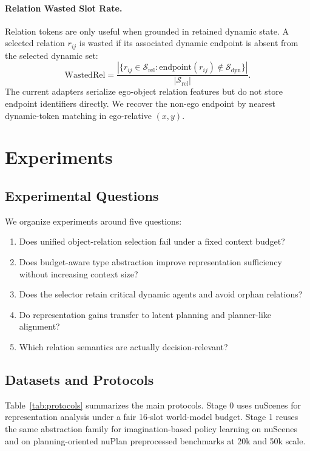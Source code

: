 \documentclass[10pt]{article}
\newcommand{\sdyn}{\mathcal{S}_{\mathrm{dyn}}}
\newcommand{\srel}{\mathcal{S}_{\mathrm{rel}}}
\newcommand{\wasted}{\mathrm{WastedRel}}
\begin{document}
\paragraph{Relation Wasted Slot Rate.}
Relation tokens are only useful when grounded in retained dynamic state. A selected relation $r_{ij}$ is wasted if its associated dynamic endpoint is absent from the selected dynamic set:
\begin{equation}
    \wasted =
    \frac{|\{r_{ij}\in \srel: \mathrm{endpoint}(r_{ij}) \notin \sdyn\}|}{|\srel|}.
\end{equation}
The current adapters serialize ego-object relation features but do not store endpoint identifiers directly. We recover the non-ego endpoint by nearest dynamic-token matching in ego-relative $(x,y)$.

\section{Experiments}
\subsection{Experimental Questions}
We organize experiments around five questions:
\begin{enumerate}
    \item Does unified object-relation selection fail under a fixed context budget?
    \item Does budget-aware type abstraction improve representation sufficiency without increasing context size?
    \item Does the selector retain critical dynamic agents and avoid orphan relations?
    \item Do representation gains transfer to latent planning and planner-like alignment?
    \item Which relation semantics are actually decision-relevant?
\end{enumerate}

\subsection{Datasets and Protocols}
Table~\ref{tab:protocols} summarizes the main protocols. Stage 0 uses nuScenes for representation analysis under a fair 16-slot world-model budget. Stage 1 reuses the same abstraction family for imagination-based policy learning on nuScenes and on planning-oriented nuPlan preprocessed benchmarks at 20k and 50k scale.
\end{document}
